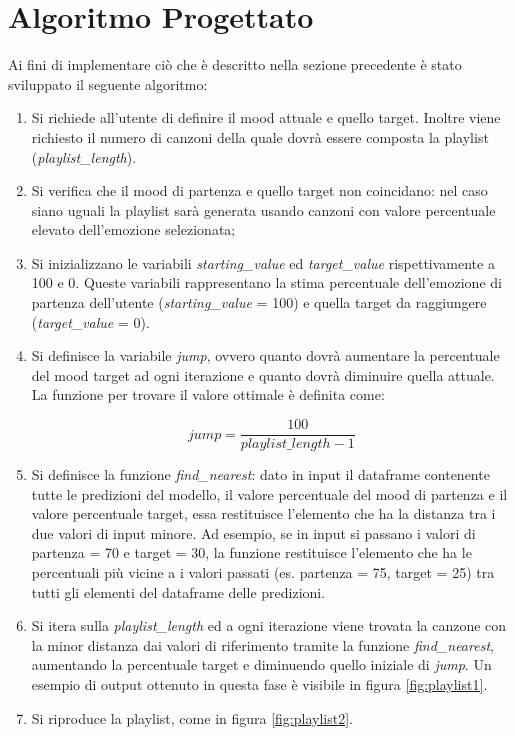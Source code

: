 \documentclass[11pt]{report}
\begin{document}
\section{Algoritmo Progettato}

Ai fini di implementare ciò che è descritto nella sezione precedente è stato sviluppato il seguente algoritmo:
\begin{enumerate}

    \item Si richiede all'utente di definire il mood attuale e quello target. Inoltre viene richiesto il numero di canzoni della quale dovrà essere composta la playlist (\textit{playlist\_length}).

    \item Si verifica che il mood di partenza e quello target non coincidano: nel caso siano uguali la playlist sarà generata usando canzoni con valore percentuale elevato dell'emozione selezionata;
    
    \item Si inizializzano le variabili \textit{starting\_value} ed \textit{target\_value} rispettivamente a 100 e 0. Queste variabili rappresentano la stima percentuale dell'emozione di partenza dell'utente (\textit{starting\_value} = 100) e quella target da raggiungere (\textit{target\_value} = 0).
    
    \item Si definisce la variabile \textit{jump}, ovvero quanto dovrà aumentare la percentuale del mood target ad ogni iterazione e quanto dovrà diminuire quella attuale. La funzione per trovare il valore ottimale è definita come:
    
    \begin{equation}
jump = \frac{100}{playlist\_length - 1}
    \end{equation}
    
    
    
    \item Si definisce la funzione \textit{find\_nearest}: dato in input il dataframe contenente tutte le predizioni del modello, il valore percentuale del mood di partenza e il valore percentuale target, essa restituisce l'elemento che ha la distanza tra i due valori di input minore. Ad esempio, se in input si passano i valori di partenza = 70 e target = 30, la funzione restituisce l'elemento che ha le percentuali più vicine a i valori passati (es. partenza = 75, target = 25) tra tutti gli elementi del dataframe delle predizioni. 
    
    \item Si itera sulla \textit{playlist\_length} ed a ogni iterazione viene trovata la canzone con la minor distanza dai valori di riferimento tramite la funzione \textit{find\_nearest}, aumentando la percentuale target e diminuendo quello iniziale di \textit{jump}. Un esempio di output ottenuto in questa fase è visibile in figura \ref{fig:playlist1}.
    
    \item Si riproduce la playlist, come in figura \ref{fig:playlist2}.
\end{enumerate}
\end{document}
